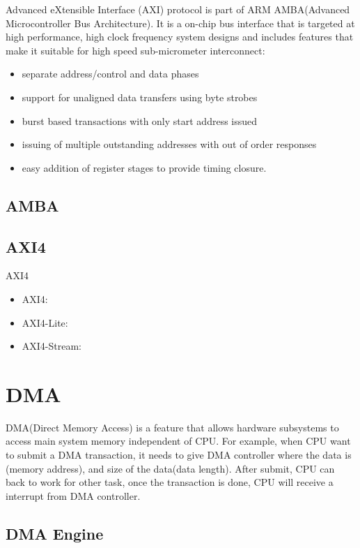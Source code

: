 Advanced eXtensible Interface (AXI) protocol is part of ARM AMBA(Advanced Microcontroller Bus Architecture).
It is a on-chip bus interface that is targeted at high performance, high clock frequency system designs and includes features that make it suitable for high speed sub-micrometer interconnect:
\begin{itemize}
\item separate address/control and data phases
\item support for unaligned data transfers using byte strobes
\item burst based transactions with only start address issued
\item issuing of multiple outstanding addresses with out of order responses
\item easy addition of register stages to provide timing closure.
\end{itemize}

\subsection{AMBA}
\label{subsec:AMBA}

 
\subsection{AXI4}
\label{subsec:AXI4}
AXI4
\begin{itemize}
\item AXI4:
\item AXI4-Lite:
\item AXI4-Stream:
\end{itemize}





\section{DMA}
\label{sec:DMA}

DMA(Direct Memory Access) is a feature that allows hardware subsystems to access main system memory independent of CPU. For example, when CPU want to submit a DMA transaction, it needs to give DMA controller where the data is (memory address), and size of the data(data length). After submit, CPU can back to work for other task, once the transaction is done, CPU will receive a interrupt from DMA controller.
 

\subsection{DMA Engine }
\label{subsec:DMA Engine}